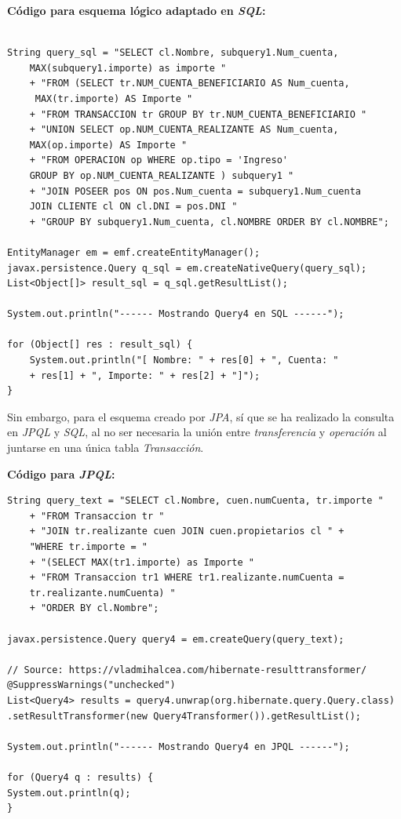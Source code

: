 \documentclass[11pt,a4paper]{article}
\begin{document}
\bigbreak
\textbf{Código para esquema lógico adaptado en \textit{SQL}:}
\begin{lstlisting}

String query_sql = "SELECT cl.Nombre, subquery1.Num_cuenta, 
	MAX(subquery1.importe) as importe "
	+ "FROM (SELECT tr.NUM_CUENTA_BENEFICIARIO AS Num_cuenta,
	 MAX(tr.importe) AS Importe "
	+ "FROM TRANSACCION tr GROUP BY tr.NUM_CUENTA_BENEFICIARIO "
	+ "UNION SELECT op.NUM_CUENTA_REALIZANTE AS Num_cuenta, 
	MAX(op.importe) AS Importe "
	+ "FROM OPERACION op WHERE op.tipo = 'Ingreso' 
	GROUP BY op.NUM_CUENTA_REALIZANTE ) subquery1 "
	+ "JOIN POSEER pos ON pos.Num_cuenta = subquery1.Num_cuenta 
	JOIN CLIENTE cl ON cl.DNI = pos.DNI "
	+ "GROUP BY subquery1.Num_cuenta, cl.NOMBRE ORDER BY cl.NOMBRE";

EntityManager em = emf.createEntityManager();
javax.persistence.Query q_sql = em.createNativeQuery(query_sql);
List<Object[]> result_sql = q_sql.getResultList();

System.out.println("------ Mostrando Query4 en SQL ------");

for (Object[] res : result_sql) {
	System.out.println("[ Nombre: " + res[0] + ", Cuenta: " 
	+ res[1] + ", Importe: " + res[2] + "]");
}
\end{lstlisting}
\bigbreak
Sin embargo, para el esquema creado por \textit{JPA}, sí que se ha realizado la consulta en \textit{JPQL} y \textit{SQL}, al no ser necesaria la unión entre \textit{transferencia} y \textit{operación} al juntarse en una única tabla \textit{Transacción}.

\bigbreak
\textbf{Código para \textit{JPQL}:}

\begin{lstlisting}
String query_text = "SELECT cl.Nombre, cuen.numCuenta, tr.importe " 
	+ "FROM Transaccion tr "
	+ "JOIN tr.realizante cuen JOIN cuen.propietarios cl " + 
	"WHERE tr.importe = "
	+ "(SELECT MAX(tr1.importe) as Importe "
	+ "FROM Transaccion tr1 WHERE tr1.realizante.numCuenta = 
	tr.realizante.numCuenta) "
	+ "ORDER BY cl.Nombre";

javax.persistence.Query query4 = em.createQuery(query_text);

// Source: https://vladmihalcea.com/hibernate-resulttransformer/
@SuppressWarnings("unchecked")
List<Query4> results = query4.unwrap(org.hibernate.query.Query.class)
.setResultTransformer(new Query4Transformer()).getResultList();

System.out.println("------ Mostrando Query4 en JPQL ------");

for (Query4 q : results) {
System.out.println(q);
}
\end{lstlisting}
\end{document}
